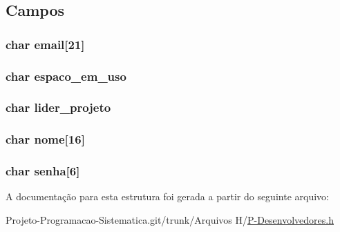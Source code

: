\subsection{Campos}
\hypertarget{structdesenvolvedor_abc1429bf9b552e0057eef7b3ecb9d3d6}{
\subsubsection[{email}]{\setlength{\rightskip}{0pt plus 5cm}char email\mbox{[}21\mbox{]}}}\label{structdesenvolvedor_abc1429bf9b552e0057eef7b3ecb9d3d6}
\hypertarget{structdesenvolvedor_ac3e8c7c6241d02565c6e336495960947}{
\subsubsection[{espaco\-\_\-em\-\_\-uso}]{\setlength{\rightskip}{0pt plus 5cm}char espaco\-\_\-em\-\_\-uso}}\label{structdesenvolvedor_ac3e8c7c6241d02565c6e336495960947}
\hypertarget{structdesenvolvedor_a4fa66754a685d69aea2a1b82bbae7263}{
\subsubsection[{lider\-\_\-projeto}]{\setlength{\rightskip}{0pt plus 5cm}char lider\-\_\-projeto}}\label{structdesenvolvedor_a4fa66754a685d69aea2a1b82bbae7263}
\hypertarget{structdesenvolvedor_a25aba59e5c950d7fdadfdb8b5f7f861d}{
\subsubsection[{nome}]{\setlength{\rightskip}{0pt plus 5cm}char nome\mbox{[}16\mbox{]}}}\label{structdesenvolvedor_a25aba59e5c950d7fdadfdb8b5f7f861d}
\hypertarget{structdesenvolvedor_a492c26f668c5dff94aaa0d91f38dde4e}{
\subsubsection[{senha}]{\setlength{\rightskip}{0pt plus 5cm}char senha\mbox{[}6\mbox{]}}}\label{structdesenvolvedor_a492c26f668c5dff94aaa0d91f38dde4e}


A documentação para esta estrutura foi gerada a partir do seguinte arquivo\-:\begin{DoxyCompactItemize}
\item 
Projeto-\/\-Programacao-\/\-Sistematica.\-git/trunk/\-Arquivos H/\hyperlink{_p-_desenvolvedores_8h}{P-\/\-Desenvolvedores.\-h}\end{DoxyCompactItemize}
